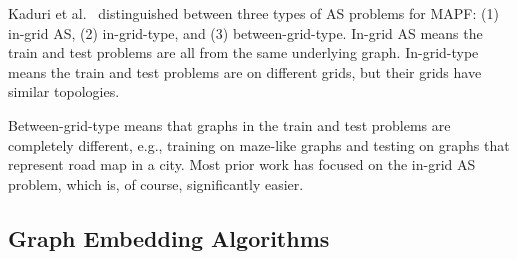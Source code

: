 \documentclass[letterpaper]{article} %
\newcommand{\Carmel}[1]{}
\newcommand{\Roni}[1]{}
\begin{document}


Kaduri et al.~\cite{kaduri2021experimental} distinguished between three types of AS problems for MAPF:
(1) in-grid AS, (2) in-grid-type, and (3) between-grid-type.
In-grid AS means the train and test problems are all from the same underlying graph.
In-grid-type means the train and test problems are on different grids, but their grids have similar topologies.
\Carmel{more accurate - In-grid-type means the train and test problems are from the same grid types but totally different maps}
\Roni{I rephrased}
Between-grid-type means that graphs in the train and test problems are completely different, e.g., training on maze-like graphs and testing on graphs that represent road map in a city. Most prior work has focused on the in-grid AS problem, which is, of course, significantly easier.










\subsection{Graph Embedding Algorithms}
\end{document}

